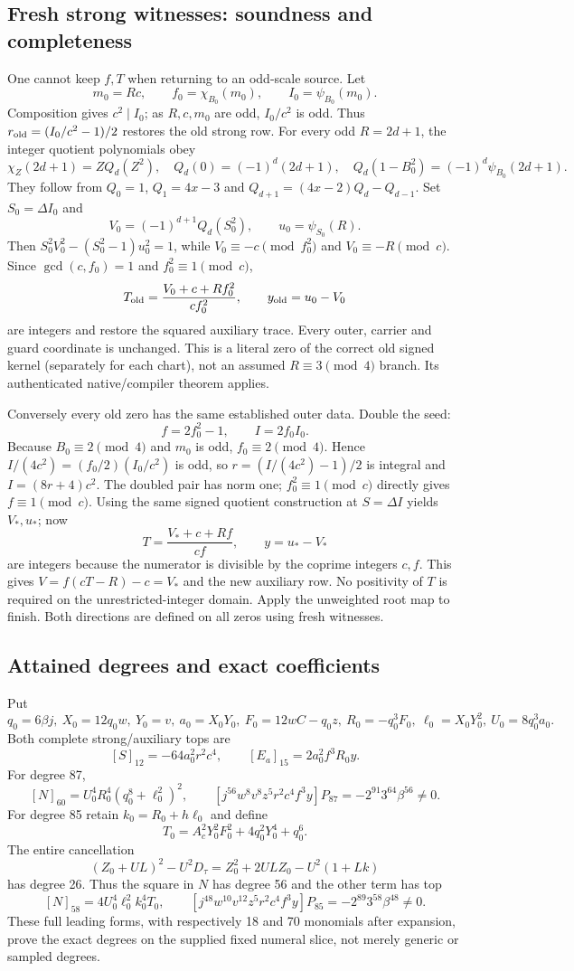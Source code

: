 \subsection{Fresh strong witnesses: soundness and completeness}
One cannot keep $f,T$ when returning to an odd-scale source. Let
\[
 m_0=Rc,\qquad f_0=\chi_{B_0}(m_0),\qquad I_0=\psi_{B_0}(m_0).
\]
Composition gives $c^2\mid I_0$; as $R,c,m_0$ are odd, $I_0/c^2$ is odd.
Thus $r_{\rm old}=(I_0/c^2-1)/2$ restores the old strong row.
For every odd $R=2d+1$, the integer quotient polynomials obey
\[
 \chi_Z(2d+1)=ZQ_d(Z^2),\quad Q_d(0)=(-1)^d(2d+1),\quad
 Q_d(1-B_0^2)=(-1)^d\psi_{B_0}(2d+1).
\]
They follow from $Q_0=1$, $Q_1=4x-3$ and
$Q_{d+1}=(4x-2)Q_d-Q_{d-1}$. Set $S_0=\Delta I_0$ and
\[
 V_0=(-1)^{d+1}Q_d(S_0^2),\qquad u_0=\psi_{S_0}(R).
\]
Then $S_0^2V_0^2-(S_0^2-1)u_0^2=1$, while
$V_0\equiv-c\pmod {f_0^2}$ and $V_0\equiv-R\pmod c$.
Since $\gcd(c,f_0)=1$ and $f_0^2\equiv1\pmod c$,
\[
 T_{\rm old}=\frac{V_0+c+Rf_0^2}{cf_0^2},\qquad y_{\rm old}=u_0-V_0
\]
are integers and restore the squared auxiliary trace. Every outer, carrier and
guard coordinate is unchanged. This is a literal zero of the correct old signed
kernel (separately for each chart), not an assumed $R\equiv3\pmod4$ branch.
Its authenticated native/compiler theorem applies.

Conversely every old zero has the same established outer data. Double the seed:
\[
 f=2f_0^2-1,\qquad I=2f_0I_0.
\]
Because $B_0\equiv2\pmod4$ and $m_0$ is odd, $f_0\equiv2\pmod4$.
Hence $I/(4c^2)=(f_0/2)(I_0/c^2)$ is odd, so
$r=(I/(4c^2)-1)/2$ is integral and $I=(8r+4)c^2$.
The doubled pair has norm one; $f_0^2\equiv1\pmod c$ directly gives $f\equiv1\pmod c$.
Using the same signed quotient construction at $S=\Delta I$ yields $V_*,u_*$;
now
\[
 T=\frac{V_*+c+Rf}{cf},\qquad y=u_*-V_*
\]
are integers because the numerator is divisible by the coprime integers $c,f$.
This gives $V=f(cT-R)-c=V_*$ and the new auxiliary row. No positivity of $T$
is required on the unrestricted-integer domain. Apply the unweighted root map
to finish. Both directions are defined on all zeros using fresh witnesses.

\subsection{Attained degrees and exact coefficients}
Put
\[
 q_0=6\beta j,\ X_0=12q_0w,\ Y_0=v,\ a_0=X_0Y_0,\
 F_0=12wC-q_0z,\ R_0=-q_0^3F_0,\ \ell_0=X_0Y_0^2,\ U_0=8q_0^3a_0.
\]
Both complete strong/auxiliary tops are
\[
 [S]_{12}=-64a_0^2r^2c^4,\qquad [E_a]_{15}=2a_0^2f^3R_0y.
\]
For degree 87,
\[
 [N]_{60}=U_0^4R_0^4(q_0^8+\ell_0^2)^2,
\qquad
 [j^{56}w^8v^8z^5r^2c^4f^3y]P_{87}=-2^{91}3^{64}\beta^{56}\ne0.
\]
For degree 85 retain $k_0=R_0+h\ell_0$ and define
\[
 T_0=A_c^2Y_0^2F_0^2+4q_0^2Y_0^4+q_0^6.
\]
The entire cancellation
\[
 (Z_0+UL)^2-U^2D_\tau=Z_0^2+2ULZ_0-U^2(1+Lk)
\]
has degree 26. Thus the square in $N$ has degree 56 and the other term has top
\[
 [N]_{58}=4U_0^4\ell_0^2k_0^4T_0,
\qquad
 [j^{48}w^{10}v^{12}z^5r^2c^4f^3y]P_{85}=-2^{89}3^{58}\beta^{48}\ne0.
\]
These full leading forms, with respectively 18 and 70 monomials after expansion,
prove the exact degrees on the supplied fixed numeral slice, not merely generic
or sampled degrees.

